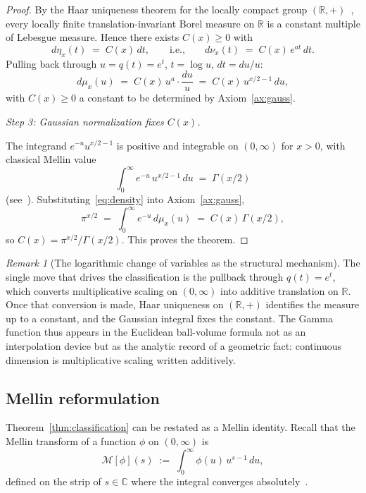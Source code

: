 \documentclass[11pt,a4paper]{article}
\theoremstyle{plain}
\theoremstyle{definition}
\theoremstyle{remark}
\newtheorem{remark}[theorem]{Remark}
\newcommand{\R}{\mathbb{R}}
\newcommand{\C}{\mathbb{C}}
\begin{document}
\begin{proof}
By the Haar uniqueness theorem for the locally compact group $(\R,+)$~\cite[Thm.~11.9]{Folland1999}, every locally finite translation-invariant Borel measure on $\R$ is a constant multiple of Lebesgue measure. Hence there exists $C(x)\ge 0$ with
\[
d\eta_x(t) \;=\; C(x)\,dt, \qquad\text{i.e.,}\qquad d\nu_x(t) \;=\; C(x)\,e^{a t}\,dt.
\]
Pulling back through $u=q(t)=e^t$, $t=\log u$, $dt=du/u$:
\begin{equation}\label{eq:density}
d\mu_x(u) \;=\; C(x)\,u^{a}\cdot\frac{du}{u} \;=\; C(x)\,u^{x/2-1}\,du,
\end{equation}
with $C(x) \ge 0$ a constant to be determined by Axiom~\ref{ax:gauss}.

\smallskip
\emph{Step 3: Gaussian normalization fixes $C(x)$.}

The integrand $e^{-u}u^{x/2-1}$ is positive and integrable on $(0,\infty)$ for $x>0$, with classical Mellin value
\[
\int_0^\infty e^{-u}\,u^{x/2-1}\,du \;=\; \Gamma(x/2)
\]
(see~\cite[\S 4]{FlajoletGourdonDumas1995}). Substituting~\eqref{eq:density} into Axiom~\ref{ax:gauss},
\[
\pi^{x/2} \;=\; \int_0^\infty e^{-u}\,d\mu_x(u) \;=\; C(x)\,\Gamma(x/2),
\]
so $C(x) = \pi^{x/2}/\Gamma(x/2)$. This proves the theorem.
\end{proof}

\begin{remark}[The logarithmic change of variables as the structural mechanism]
The single move that drives the classification is the pullback through $q(t)=e^t$, which converts multiplicative scaling on $(0,\infty)$ into additive translation on $\R$. Once that conversion is made, Haar uniqueness on $(\R,+)$ identifies the measure up to a constant, and the Gaussian integral fixes the constant. The Gamma function thus appears in the Euclidean ball-volume formula not as an interpolation device but as the analytic record of a geometric fact: continuous dimension is multiplicative scaling written additively.
\end{remark}

\subsection*{Mellin reformulation}

Theorem~\ref{thm:classification} can be restated as a Mellin identity. Recall that the Mellin transform of a function $\phi$ on $(0,\infty)$ is
\[
\mathcal M[\phi](s) \;:=\; \int_0^\infty \phi(u)\,u^{s-1}\,du,
\]
defined on the strip of $s\in\C$ where the integral converges absolutely~\cite[\S 4]{FlajoletGourdonDumas1995}.
\end{document}
